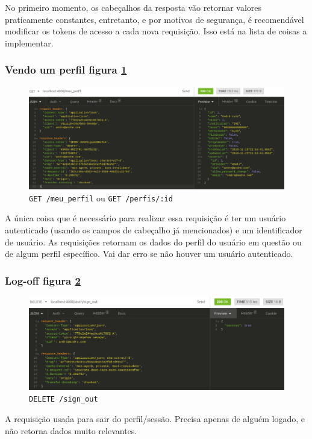 No primeiro momento, os cabeçalhos da resposta vão retornar valores praticamente constantes, entretanto, e por motivos de
segurança, é recomendável modificar os tokens de acesso a cada nova requisição. Isso está na lista de coisas a implementar.

\subsubsection{Vendo um perfil \hfill figura \ref{fig:ver-perfil}}

\begin{figure}[ht]
  \centering
  \includegraphics[width=.75\textwidth]{figuras/ver-perfil.png}
  \caption{\texttt{GET /meu\_perfil} ou \texttt{GET /perfis/:id}}
  \label{fig:ver-perfil}
\end{figure}

A única coisa que é necessário para realizar essa requisição é ter um usuário autenticado (usando os campos de cabeçalho
já mencionados) e um identificador de usuário. As requisições retornam os dados do perfil do usuário em questão ou de
algum perfil específico. Vai dar erro se não houver um usuário autenticado.

\subsubsection{Log-off \hfill figura \ref{fig:saindo}}

\begin{figure}[ht]
  \centering
  \includegraphics[width=.75\textwidth]{figuras/sign-out.png}
  \caption{\texttt{DELETE /sign\_out}}
  \label{fig:saindo}
\end{figure}

A requisição usada para sair do perfil/sessão. Precisa apenas de alguém logado, e não retorna dados muito relevantes.

